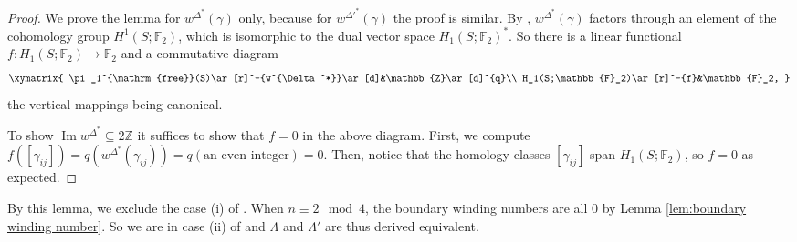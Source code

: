 \documentclass[11pt,reqno]{amsart}
\theoremstyle{plain}
\theoremstyle{definition}
\theoremstyle{remark}
\numberwithin{equation}{section}
\begin{document}
\begin{proof}
    We prove the lemma for $w^{\Delta^*}(\gamma)$ only, because for $w^{\Delta'^*}(\gamma)$ the proof is similar. By \cite[Proposition 3.4(4)]{APS}, $w^{\Delta^*}(\gamma)$ factors through an element of the cohomology group $H^1(S;\mathbb{F}_2)$, which is isomorphic to the dual vector space $H_1(S;\mathbb{F}_2)^*$. So there is a linear functional $f:H_1(S;\mathbb{F}_2)\to\mathbb{F}_2$ and a commutative diagram
    \[\xymatrix{
        \pi_1^{\mathrm{free}}(S)\ar[r]^-{w^{\Delta^*}}\ar[d]&\mathbb{Z}\ar[d]^{q}\\
        H_1(S;\mathbb{F}_2)\ar[r]^-{f}&\mathbb{F}_2,
    }\]
    the vertical mappings being canonical. 
    \par To show $\mathop{\mathrm{Im}}w^{\Delta^*}\subseteq2\mathbb{Z}$ it suffices to show that $f=0$ in the above diagram. First, we compute $f([\gamma_{ij}])=q(w^{\Delta^*}(\gamma_{ij}))=q(\text{an even integer})=0$. Then, notice that the homology classes $[\gamma_{ij}]$ span $H_1(S;\mathbb{F}_2)$, so $f=0$ as expected.
\end{proof}

\par By this lemma, we exclude the case (i) of \cite[Theorem 7.4(3)(b)]{APS}. When $n\equiv2\mod4$, the boundary winding numbers are all $0$ by Lemma \ref{lem:boundary winding number}. So we are in case (ii) of \cite[loc. cit.]{APS} and $\Lambda$ and $\Lambda'$ are thus derived equivalent.
\end{document}
